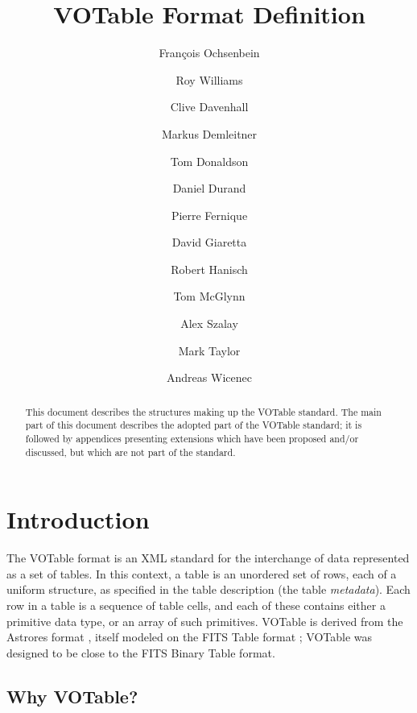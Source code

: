 \documentclass[11pt,a4paper]{ivoa}
\title{VOTable Format Definition}
\author[http://www.ivoa.net/twiki/bin/view/IVOA/FrancoisOchsenbein]
                                               {Fran\c{c}ois Ochsenbein}
\author[http://www.ivoa.net/twiki/bin/view/IVOA/RoyWilliams]{Roy Williams}
\author[http://www.ivoa.net/twiki/bin/view/IVOA/CliveDavenhall]{Clive Davenhall}
\author[http://www.ivoa.net/twiki/bin/view/IVOA/MarkusDemleitner]
                                               {Markus Demleitner}
\author[http://www.ivoa.net/twiki/bin/view/IVOA/TomDonaldson]{Tom Donaldson}
\author[http://www.ivoa.net/twiki/bin/view/IVOA/DanielDurand]{Daniel Durand}
\author[http://www.ivoa.net/twiki/bin/view/IVOA/PierreFernique]{Pierre Fernique}
\author[http://www.ivoa.net/twiki/bin/view/IVOA/DavidGiaretta]{David Giaretta}
\author[http://www.ivoa.net/twiki/bin/view/IVOA/BobHanisch]{Robert Hanisch}
\author[http://www.ivoa.net/twiki/bin/view/IVOA/TomMcGlynn]{Tom McGlynn}
\author[http://www.ivoa.net/twiki/bin/view/IVOA/AlexSzalay]{Alex Szalay}
\author[http://www.ivoa.net/twiki/bin/view/IVOA/MarkTaylor]{Mark Taylor}
\author[http://www.ivoa.net/twiki/bin/view/IVOA/AndreasWicenec]{Andreas Wicenec}
\begin{document}
\begin{abstract}
This document describes the structures making up
the VOTable standard.
The main part of this document describes the adopted part of the
VOTable standard; it is followed by appendices presenting extensions
which have been proposed and/or discussed, but which are not part of
the standard.
\end{abstract}


%
%
%


\section{Introduction}

The VOTable format is an XML standard for the interchange of data
represented as a set of tables.
In this context, a table is an unordered set of rows, each of
a uniform structure, as specified in the table description
(the table {\em metadata}).
Each row in a table is a sequence of table cells, and each of these contains
either a primitive data type, or an array of such primitives.
VOTable is derived from the
Astrores format \citep{astrores}, itself modeled on the FITS Table format
\citep{std:FITS};
VOTable was designed to be close to the FITS Binary Table format.

\subsection{Why VOTable?}
\end{document}
